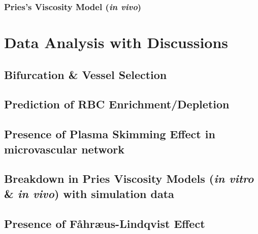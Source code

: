 \documentclass[a4paper, 11pt]{article}
\numberwithin{figure}{subsection}
\numberwithin{table}{subsection}
\begin{document}
\subsubsection{Pries's Viscosity Model (\textit{in vivo})}



\newpage
\section{Data Analysis with Discussions}


\bigskip

\subsection{Bifurcation \& Vessel Selection}
\label{Vessel_Bifurcation_Selection}


\subsection{Prediction of RBC Enrichment/Depletion}
\label{RBC_Enrichment_Depletion}


\subsection{Presence of Plasma Skimming Effect in microvascular network}
\label{Plasma_Skimming_Effects}


\subsection{Breakdown in Pries Viscosity Models (\textit{in vitro} \& \textit{in vivo}) with simulation data}
\label{BreakdownInPriesViscosityModels}


\subsection{Presence of F{\aa}hr{\ae}us-Lindqvist Effect}
\label{Fahraeus_Lindqvist_Effect}

\end{document}
